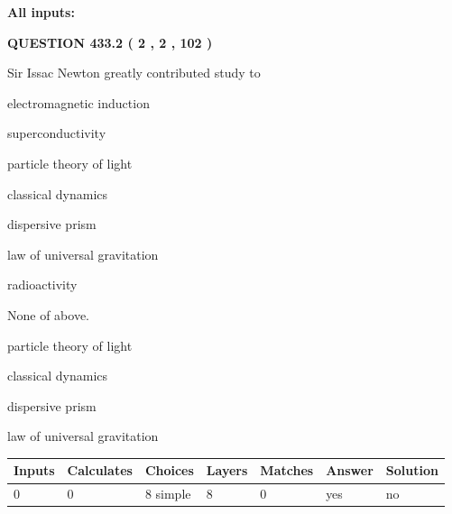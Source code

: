 \documentclass[12pt]{article}
\begin{document}
   
   
   
\noindent{}
   
   
   
   
\noindent\vspace{0.1in}\hspace{-0.08in} {\textbf{\Large{All inputs: }}}
   
   
  
\vspace{0.2in}
  
{\textbf{\Large{QUESTION
433.2 
 ( 2 , 2 , 102 )
}}}
  
  
Sir Issac Newton greatly contributed study to
 
 
electromagnetic induction
 
 
superconductivity
 
 
particle theory of light
 
 
classical dynamics
 
 
dispersive prism
 
 
law of universal gravitation
 
 
radioactivity
 
 
 None of above.
 
 
\noindent{}
 
 
particle theory of light
 
 
classical dynamics
 
 
dispersive prism
 
 
law of universal gravitation
 
 
\noindent{}
 
 
   
   
   
   
\noindent\begin{tabular}{|l|l|l|l|l|l|l|}
 \hline
Inputs & Calculates & Choices & Layers & Matches & Answer & Solution \\ \hline
 0  & 
 0  & 
 8
  simple  
  & 
 8  & 
 0  & 
  yes & 
  no 
  \\ \hline
 \end{tabular}
   
\end{document}
